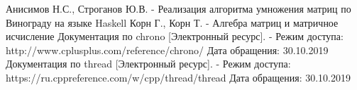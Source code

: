 %
%

\begin{thebibliography}{}
     Анисимов Н.С., Строганов Ю.В. - Реализация алгоритма умножения матриц по Винограду на языке Haskell
     Корн Г., Корн Т. - Алгебра матриц и матричное исчисление
     Документация по chrono [Электронный ресурс]. - Режим доступа: http://www.cplusplus.com/reference/chrono/ Дата обращения: 30.10.2019
     Документация по thread [Электронный ресурс]. - Режим доступа: https://ru.cppreference.com/w/cpp/thread/thread Дата обращения: 30.10.2019
\end{thebibliography}

